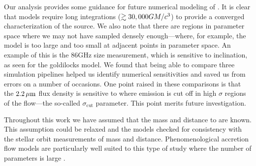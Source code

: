 Our analysis provides some guidance for future numerical modeling of \sgra.
It is clear that models require long integrations ($\gtrsim  30,000 GM/c^3$) to provide a converged characterization of the source.
We also note that there are regions in parameter space where we may not have sampled densely enough---where, for example, the model is too large and too small at adjacent points in parameter space.
An example of this is the 86GHz size measurement, which is sensitive to inclination, as seen for the goldilocks model.
We found that being able to compare three simulation pipelines helped us identify numerical sensitivities and saved us from errors on a number of occasions.
One point raised in these comparisons is that the $2.2\,\mu\mathrm{m}$ flux density is sensitive to where emission is cut off in high $\sigma$ regions of the flow---the so-called $\sigma_\mathrm{cut}$ parameter.
This point merits future investigation.

Throughout this work we have assumed that the mass and distance to \sgra are known.
This assumption could be relaxed and the models checked for consistency with the stellar orbit measurements of mass and distance.
Phenomenological accretion flow models are particularly well suited to this type of study where the number of parameters is large  \citep[e.g.,]{2009ApJ...697...45B}.
